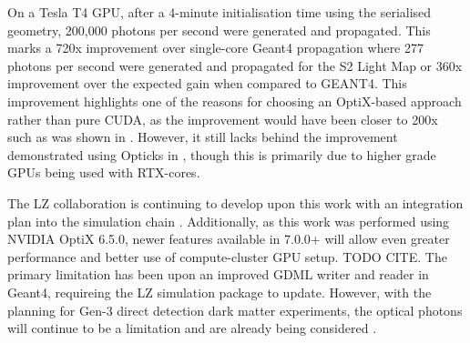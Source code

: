 \par
On a Tesla T4 GPU, after a 4-minute initialisation time using the serialised geometry, 200,000 photons per second were generated and propagated.
This marks a 720x improvement over single-core Geant4 propagation where 277 photons per second were generated and propagated for the S2 Light Map or 360x improvement over the expected gain when compared to GEANT4.
This improvement highlights one of the reasons for choosing an OptiX-based approach rather than pure CUDA, as the improvement would have been closer to 200x such as was shown in \cite{chroma_presentation_ref}.
However, it still lacks behind the improvement demonstrated using Opticks in \cite{Opticks_CHEP_2019_ref}, though this is primarily due to higher grade GPUs being used with RTX-cores.

\par
The LZ collaboration is continuing to develop upon this work with an integration plan into the simulation chain \cite{SEriksen_Opticks_CHEP_2021_ref, SEriksen_IoP_2021_talk_ref, lz_status_with_opticks_ref}.
Additionally, as this work was performed using NVIDIA OptiX 6.5.0, newer features available in 7.0.0+ will allow even greater performance and better use of compute-cluster GPU setup.
TODO CITE.
The primary limitation has been upon an improved GDML writer and reader in Geant4, requireing the LZ simulation package to update. 
However, with the planning for Gen-3 direct detection dark matter experiments, the optical photons will continue to be a limitation and are already being considered \cite{DARWIN_GPU_simulations_2022_ref,  accelerated_bvh_ref}.